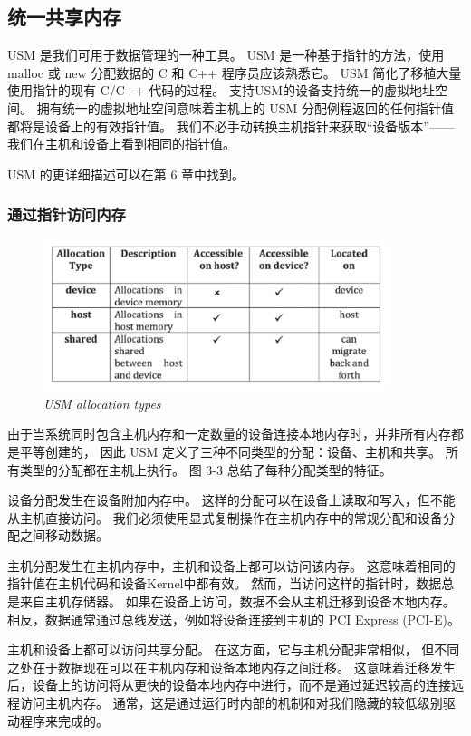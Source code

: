 \subsection{统一共享内存}
USM 是我们可用于数据管理的一种工具。 
USM 是一种基于指针的方法，使用 malloc 或 new 分配数据的 C 和 C++ 程序员应该熟悉它。 
USM 简化了移植大量使用指针的现有 C/C++ 代码的过程。 支持USM的设备支持统一的虚拟地址空间。 
拥有统一的虚拟地址空间意味着主机上的 USM 分配例程返回的任何指针值都将是设备上的有效指针值。 
我们不必手动转换主机指针来获取“设备版本”——我们在主机和设备上看到相同的指针值。

USM 的更详细描述可以在第 6 章中找到。

\subsubsection{通过指针访问内存}
\begin{figure}[H]
	\centering
	\includegraphics[width=0.9\textwidth]{figs/F3.3.png}
	\caption{\textit{USM allocation types}}
\end{figure}

由于当系统同时包含主机内存和一定数量的设备连接本地内存时，并非所有内存都是平等创建的，
因此 USM 定义了三种不同类型的分配：设备、主机和共享。 所有类型的分配都在主机上执行。 
图 3-3 总结了每种分配类型的特征。

设备分配发生在设备附加内存中。 这样的分配可以在设备上读取和写入，但不能从主机直接访问。 
我们必须使用显式复制操作在主机内存中的常规分配和设备分配之间移动数据。

主机分配发生在主机内存中，主机和设备上都可以访问该内存。 这意味着相同的指针值在主机代码和设备Kernel中都有效。 
然而，当访问这样的指针时，数据总是来自主机存储器。 如果在设备上访问，数据不会从主机迁移到设备本地内存。 
相反，数据通常通过总线发送，例如将设备连接到主机的 PCI Express (PCI-E)。

主机和设备上都可以访问共享分配。 在这方面，它与主机分配非常相似，
但不同之处在于数据现在可以在主机内存和设备本地内存之间迁移。 
这意味着迁移发生后，设备上的访问将从更快的设备本地内存中进行，而不是通过延迟较高的连接远程访问主机内存。 
通常，这是通过运行时内部的机制和对我们隐藏的较低级别驱动程序来完成的。

